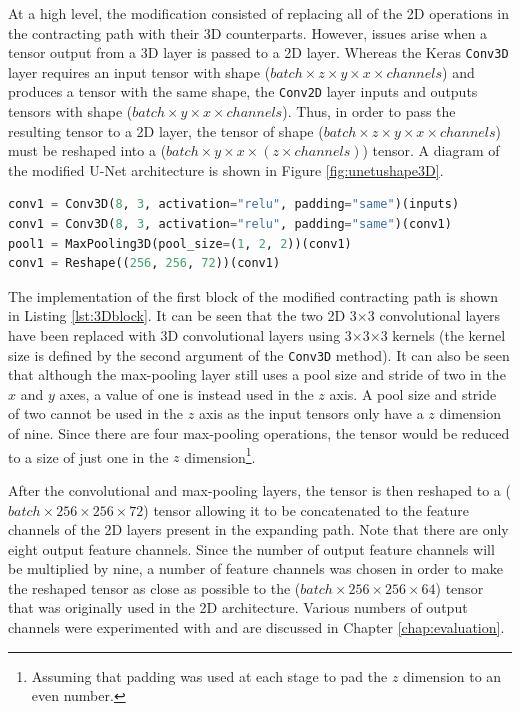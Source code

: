 At a high level, the modification consisted of replacing all of the 2D operations in the contracting path with their 3D counterparts. However, issues arise when a tensor output from a 3D layer is passed to a 2D layer. Whereas the Keras \texttt{Conv3D} layer requires an input tensor with shape ($batch \times z \times y \times x \times channels$) and produces a tensor with the same shape, the \texttt{Conv2D} layer inputs and outputs tensors with shape ($batch \times y \times x \times channels$). Thus, in order to pass the resulting tensor to a 2D layer, the tensor of shape ($batch \times z \times y \times x \times channels$) must be reshaped into a ($batch \times y \times x \times (z \times channels)$) tensor. A diagram of the modified U-Net architecture is shown in Figure \ref{fig:unetushape3D}.

\begin{lstlisting}[float={!t},caption={The implementation of the first contracting block of the modified U-Net architecture using the Keras functional API.},label={lst:3Dblock},language=Python,upquote=true,belowskip=0pt]
conv1 = Conv3D(8, 3, activation="relu", padding="same")(inputs)
conv1 = Conv3D(8, 3, activation="relu", padding="same")(conv1)
pool1 = MaxPooling3D(pool_size=(1, 2, 2))(conv1)
conv1 = Reshape((256, 256, 72))(conv1)
\end{lstlisting}
The implementation of the first block of the modified contracting path is shown in Listing \ref{lst:3Dblock}. It can be seen that the two 2D 3$\times$3 convolutional layers have been replaced with 3D convolutional layers using 3$\times$3$\times$3 kernels (the kernel size is defined by the second argument of the \texttt{Conv3D} method). It can also be seen that although the max-pooling layer still uses a pool size and stride of two in the $x$ and $y$ axes, a value of one is instead used in the $z$ axis. A pool size and stride of two cannot be used in the $z$ axis as the input tensors only have a $z$ dimension of nine. Since there are four max-pooling operations, the tensor would be reduced to a size of just one in the $z$ dimension\footnote{Assuming that padding was used at each stage to pad the $z$ dimension to an even number.}.

After the convolutional and max-pooling layers, the tensor is then reshaped to a ($batch \times 256 \times 256 \times 72$) tensor allowing it to be concatenated to the feature channels of the 2D layers present in the expanding path. Note that there are only eight output feature channels. Since the number of output feature channels will be multiplied by nine, a number of feature channels was chosen in order to make the reshaped tensor as close as possible to the ($batch \times 256 \times 256 \times 64$) tensor that was originally used in the 2D architecture. Various numbers of output channels were experimented with and are discussed in Chapter \ref{chap:evaluation}.

